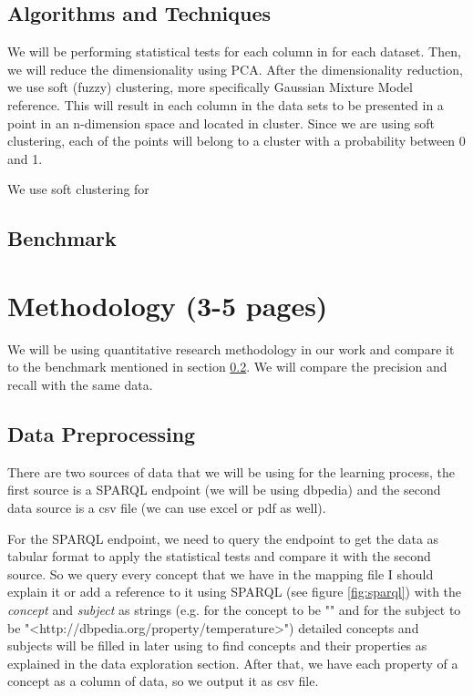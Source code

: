\documentclass{article}
\newcommand{\comm}[2][inline]{\color{red}#2\color{black}}
\begin{document}
\subsection{Algorithms and Techniques}

We will be performing statistical tests for each column in for each dataset. Then, we will reduce the dimensionality using PCA. After the dimensionality reduction, we use soft (fuzzy) clustering, more specifically \comm{Gaussian Mixture Model} \comm{reference}. This will result in each column in the data sets to be presented in a point in an n-dimension space and located in cluster. Since we are using soft clustering, each of the points will belong to a cluster with a probability between 0 and 1. 

  


We use soft clustering for

\subsection{Benchmark}\label{benchmark-sec}


\section{Methodology (3-5 pages)}
We will be using quantitative research methodology in our work and compare it to the benchmark mentioned in section \ref{benchmark-sec}. We will compare the precision and recall with the same data.

\subsection{Data Preprocessing}
There are two sources of data that we will be using for the learning process, the first source is a SPARQL endpoint \cite{w3c-sparql} (we will be using dbpedia) and the second data source is a csv file (we can use excel or pdf as well). 

For the SPARQL endpoint, we need to query the endpoint to get the data as tabular format to apply the statistical tests and compare it with the second source. So we query every concept that we have in the mapping file \comm{I should explain it or add a reference to it} using SPARQL (see figure \ref{fig:sparql}) with the \textit{concept} and \textit{subject} as strings (e.g. for the concept to be "" and for the subject to be "<http://dbpedia.org/property/temperature>") \comm{detailed concepts and subjects will be filled in later} using \cite{loupe} to find concepts and their properties as explained in the data exploration section. After that, we have each property of a concept as a column of data, so we output it as csv file.
\end{document}
